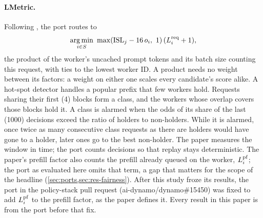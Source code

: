 \paragraph{LMetric.}
Following \citet{zhang2026lmetric}, the  port routes to
\begin{equation}
  \label{eq:lmetric-port}
  \operatorname*{arg\,min}_{i\in S}\ \max(\mathrm{ISL}_j - 16\,o_i,\ 1)\,(L^{\mathrm{req}}_i + 1),
\end{equation}
the product of the worker's uncached prompt tokens and its batch size counting this request,
with ties to the lowest worker ID. A product needs no weight between its factors: a weight on
either one scales every candidate's score alike. A hot-spot detector handles a popular prefix
that few workers hold. Requests sharing their first  (4) blocks form a
class, and the workers whose overlap covers those blocks hold it. A class is alarmed when the
odds of its share of the last  (1000) decisions exceed the ratio of
holders to non-holders. While it is alarmed, once twice as many consecutive class requests as
there are holders would have gone to a holder, later ones go to the best non-holder. The paper
measures the window in time; the port counts decisions so that replay stays deterministic. The
paper's prefill factor also counts the prefill already queued on the worker, $L^{\mathrm{pf}}_i$; the port as
evaluated here omits that term, a gap that matters for the scope of the headline
(\cref{sec:ports,sec:res-fairness}). After this study froze its results, the port in the policy-stack
pull request (ai-dynamo/dynamo\#15450) was fixed to add $L^{\mathrm{pf}}_i$ to the prefill factor, as the paper
defines it. Every  result in this paper is from the port before that fix.

